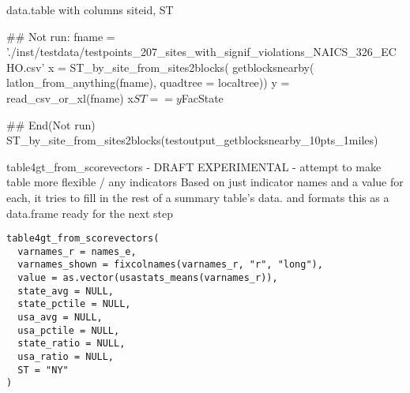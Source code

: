 \documentclass[a4paper]{book}
\begin{document}
%
\begin{Value}
data.table with columns  siteid, ST
\end{Value}
%
\begin{Examples}
\begin{ExampleCode}
## Not run: 
  fname = './inst/testdata/testpoints_207_sites_with_signif_violations_NAICS_326_ECHO.csv'
  x = ST_by_site_from_sites2blocks(
    getblocksnearby( latlon_from_anything(fname), quadtree = localtree))
  y = read_csv_or_xl(fname)
  x$ST == y$FacState
  
## End(Not run)
  ST_by_site_from_sites2blocks(testoutput_getblocksnearby_10pts_1miles) 
  
\end{ExampleCode}
\end{Examples}
%
\begin{Description}\relax
table4gt\_from\_scorevectors - DRAFT EXPERIMENTAL - attempt to make table more flexible / any indicators
Based on just indicator names and a value for each, it tries to fill in the rest of a summary table's data.
and formats this as a data.frame ready for the next step
\end{Description}
%
\begin{Usage}
\begin{verbatim}
table4gt_from_scorevectors(
  varnames_r = names_e,
  varnames_shown = fixcolnames(varnames_r, "r", "long"),
  value = as.vector(usastats_means(varnames_r)),
  state_avg = NULL,
  state_pctile = NULL,
  usa_avg = NULL,
  usa_pctile = NULL,
  state_ratio = NULL,
  usa_ratio = NULL,
  ST = "NY"
)
\end{verbatim}
\end{Usage}
%
\end{document}
